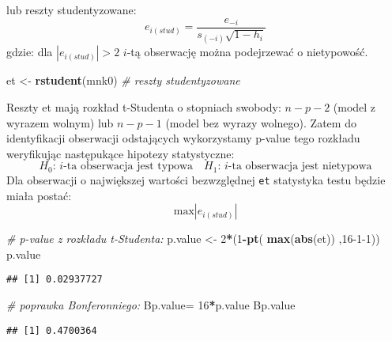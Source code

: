 \documentclass[polish,]{book}
\newenvironment{Shaded}{\begin{snugshade}}{\end{snugshade}}
\newcommand{\CommentTok}[1]{\textcolor[rgb]{0.56,0.35,0.01}{\textit{#1}}}
\newcommand{\DecValTok}[1]{\textcolor[rgb]{0.00,0.00,0.81}{#1}}
\newcommand{\KeywordTok}[1]{\textcolor[rgb]{0.13,0.29,0.53}{\textbf{#1}}}
\newcommand{\NormalTok}[1]{#1}
\newcommand{\OperatorTok}[1]{\textcolor[rgb]{0.81,0.36,0.00}{\textbf{#1}}}
\newcommand{\StringTok}[1]{\textcolor[rgb]{0.31,0.60,0.02}{#1}}
\begin{document}
lub reszty studentyzowane:
\begin{equation}
e_{i(stud)}=\frac{e_{-i}}{s_{(-i)}\sqrt{1-h_i}}
\label{eq:wz1323}
\end{equation}
gdzie: dla \(|e_{i(stud)}|>2\) \(i\)-tą obserwację można podejrzewać o nietypowość.

\begin{Shaded}
\begin{Highlighting}[]
\NormalTok{et <-}\StringTok{ }\KeywordTok{rstudent}\NormalTok{(mnk0)  }\CommentTok{# reszty studentyzowane}
\end{Highlighting}
\end{Shaded}

Reszty et mają rozkład t-Studenta o stopniach swobody: \(n-p-2\) (model z wyrazem
wolnym) lub \(n-p-1\) (model bez wyrazy wolnego). Zatem do identyfikacji obserwacji
odstających wykorzystamy p-value tego rozkładu weryfikując następukące hipotezy
statystyczne:
\[
H_{0}:\,i\mbox{-ta obserwacja jest typowa}\quad H_{1}:\,i\mbox{-ta obserwacja jest nietypowa}
\]
Dla obserwacji o największej wartości bezwzględnej \texttt{et} statystyka testu będzie miała postać:
\begin{equation}
\mbox{max}|e_{i(stud)}|
\label{eq:wz1325}
\end{equation}

\begin{Shaded}
\begin{Highlighting}[]
\CommentTok{# p-value z rozkładu t-Studenta:}
\NormalTok{p.value <-}\StringTok{ }\DecValTok{2}\OperatorTok{*}\NormalTok{(}\DecValTok{1}\OperatorTok{-}\KeywordTok{pt}\NormalTok{( }\KeywordTok{max}\NormalTok{(}\KeywordTok{abs}\NormalTok{(et)) ,}\DecValTok{16-1-1}\NormalTok{))}
\NormalTok{p.value}
\end{Highlighting}
\end{Shaded}

\begin{verbatim}
## [1] 0.02937727
\end{verbatim}

\begin{Shaded}
\begin{Highlighting}[]
\CommentTok{# poprawka Bonferonniego:}
\NormalTok{Bp.value=}\StringTok{ }\DecValTok{16}\OperatorTok{*}\NormalTok{p.value}
\NormalTok{Bp.value}
\end{Highlighting}
\end{Shaded}

\begin{verbatim}
## [1] 0.4700364
\end{verbatim}
\end{document}
